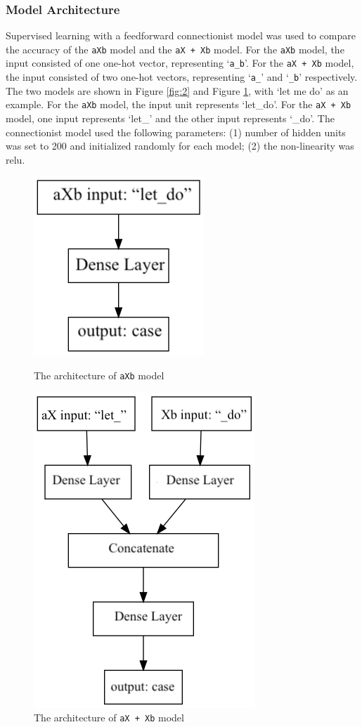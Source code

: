 \subsubsection{Model Architecture}
Supervised learning with a feedforward connectionist model was used to compare the accuracy of the \texttt{aXb} model and the \texttt{aX + Xb} model. For the \texttt{aXb} model, the input consisted of one one-hot vector, representing `\texttt{a\_b}'. For the \texttt{aX + Xb} model, the input consisted of two one-hot vectors, representing `\texttt{a\_}' and `\texttt{\_b}' respectively. The two models are shown in Figure \ref{fig:2} and Figure \ref{fig:3}, with `let me do' as an example. For the \texttt{aXb} model, the input unit represents `let\_do'. For the \texttt{aX + Xb} model, one input represents `let\_' and the other input represents `\_do'.  The connectionist model used the following parameters: (1) number of hidden units was set to 200 and initialized randomly for each model; (2) the non-linearity was relu.  
\begin{figure}[ht]
   \centering
    \includegraphics[scale = 0.4]{graph/aXb.png}
    \caption{The architecture of \texttt{aXb} model}
    \label{fig:2}
    \centering
    \includegraphics[scale = 0.5]{graph/aX+Xb.png}
    \caption{The architecture of \texttt{aX + Xb} model}
    \label{fig:3}
\end{figure}
